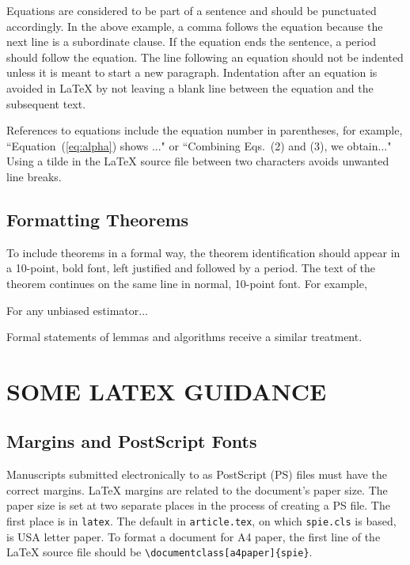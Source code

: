 \documentclass[a4paper]{spie}  %
\begin{document}
Equations are considered to be part of a sentence and should be punctuated accordingly. In the above example, a comma follows the equation because the next line is a subordinate clause.  If the equation ends the sentence, a period should follow the equation.  The line following an equation should not be indented unless it is meant to start a new paragraph.  Indentation after an equation is avoided in LaTeX by not leaving a blank line between the equation and the subsequent text.

References to equations include the equation number in parentheses, for example, ``Equation~(\ref{eq:alpha}) shows ..." or ``Combining Eqs.~(2) and (3), we obtain..."  Using a tilde in the LaTeX source file between two characters avoids unwanted line breaks.

\subsection{Formatting Theorems} 

To include theorems in a formal way, the theorem identification should appear in a 10-point, bold font, left justified and followed by a period.  The text of the theorem continues on the same line in normal, 10-point font.  For example, 

 For any unbiased estimator...

Formal statements of lemmas and algorithms receive a similar treatment.

\section{SOME LATEX GUIDANCE} \label{sec:latex}

\subsection{Margins and PostScript Fonts}
 
Manuscripts submitted electronically to as PostScript (PS) files must have the correct margins. LaTeX margins are related to the document's paper size. The paper size is set at two separate places in the process of creating a PS file. The first place is in {\tt latex}. The default in {\tt article.tex}, on which {\tt spie.cls} is based, is USA letter paper. To format a document for A4 paper, the first line of the LaTeX source file should be \verb|\documentclass[a4paper]{spie}|.   
\end{document}
